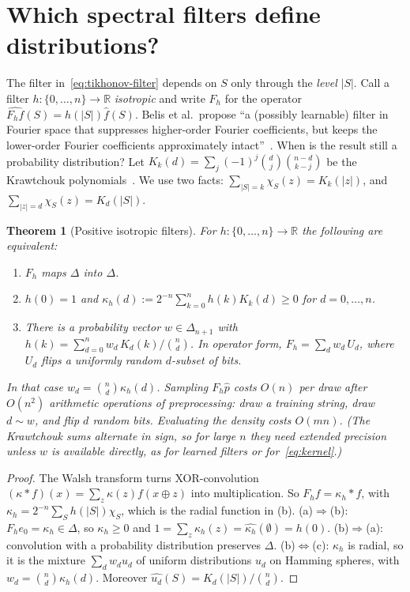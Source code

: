 \documentclass[11pt]{article}
\newtheorem{theorem}{Theorem}
\theoremstyle{definition}
\theoremstyle{remark}
\newcommand{\R}{\mathbb{R}}
\newcommand{\simplex}{\Delta}
\newcommand{\hp}{\hat p}
\newcommand{\wh}[1]{\widehat{#1}}
\begin{document}
\section{Which spectral filters define distributions?}
\label{sec:filters}

The filter in~\eqref{eq:tikhonov-filter} depends on $S$ only through the \emph{level} $|S|$. Call a filter $h:\{0,\dots,n\}\to\R$ \emph{isotropic} and write $F_h$ for the operator $\wh{F_hf}(S)=h(|S|)\wh f(S)$. Belis et al.\ propose ``a (possibly learnable) filter in Fourier space that suppresses higher-order Fourier coefficients, but keeps the lower-order Fourier coefficients approximately intact''~\cite{belis2026spectral}. When is the result still a probability distribution? Let $K_k(d)=\sum_{j}(-1)^j\binom{d}{j}\binom{n-d}{k-j}$ be the Krawtchouk polynomials~\cite{macwilliams1977codes}. We use two facts: $\sum_{|S|=k}\chi_S(z)=K_k(|z|)$, and $\sum_{|z|=d}\chi_S(z)=K_d(|S|)$.

\begin{theorem}[Positive isotropic filters]\label{thm:isotropic}
For $h:\{0,\dots,n\}\to\R$ the following are equivalent:
\begin{enumerate}
\item[(a)] $F_h$ maps $\simplex$ into $\simplex$.
\item[(b)] $h(0)=1$ and $\kappa_h(d):=2^{-n}\sum_{k=0}^n h(k)K_k(d)\ge0$ for $d=0,\dots,n$.
\item[(c)] There is a probability vector $w\in\simplex_{n+1}$ with $h(k)=\sum_{d=0}^n w_d\,K_d(k)/\binom nd$. In operator form, $F_h=\sum_d w_d\,U_d$, where $U_d$ flips a uniformly random $d$-subset of bits.
\end{enumerate}
In that case $w_d=\binom nd\kappa_h(d)$. Sampling $F_h\hp$ costs $O(n)$ per draw after $O(n^2)$ arithmetic operations of preprocessing: draw a training string, draw $d\sim w$, and flip $d$ random bits. Evaluating the density costs $O(mn)$. (The Krawtchouk sums alternate in sign, so for large $n$ they need extended precision unless $w$ is available directly, as for learned filters or for~\eqref{eq:kernel}.)
\end{theorem}
\begin{proof}
The Walsh transform turns XOR-convolution $(\kappa*f)(x)=\sum_z\kappa(z)f(x\oplus z)$ into multiplication. So $F_hf=\kappa_h*f$, with $\kappa_h=2^{-n}\sum_S h(|S|)\chi_S$, which is the radial function in (b). (a)$\Rightarrow$(b): $F_h e_0=\kappa_h\in\simplex$, so $\kappa_h\ge0$ and $1=\sum_z\kappa_h(z)=\wh{\kappa_h}(\emptyset)=h(0)$. (b)$\Rightarrow$(a): convolution with a probability distribution preserves $\simplex$. (b)$\Leftrightarrow$(c): $\kappa_h$ is radial, so it is the mixture $\sum_d w_d u_d$ of uniform distributions $u_d$ on Hamming spheres, with $w_d=\binom nd\kappa_h(d)$. Moreover $\wh{u_d}(S)=K_d(|S|)/\binom nd$.
\end{proof}
\end{document}
